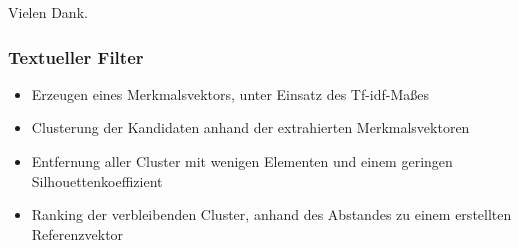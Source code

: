 \documentclass[utf8]{beamer}
\begin{document}
\begin{frame}
    \begin{center}
        \Huge Vielen Dank.
    \end{center}
\end{frame}

\appendix

\begin{frame}
  \frametitle{Textueller Filter}
  \begin{itemize}
      \item Erzeugen eines Merkmalsvektors, unter Einsatz des Tf-idf-Maßes
      \item Clusterung der Kandidaten anhand der extrahierten Merkmalsvektoren
      \item Entfernung aller Cluster mit wenigen Elementen und einem geringen Silhouettenkoeffizient
      \item Ranking der verbleibenden Cluster, anhand des Abstandes zu einem erstellten Referenzvektor
  \end{itemize}
\end{frame}
\end{document}

